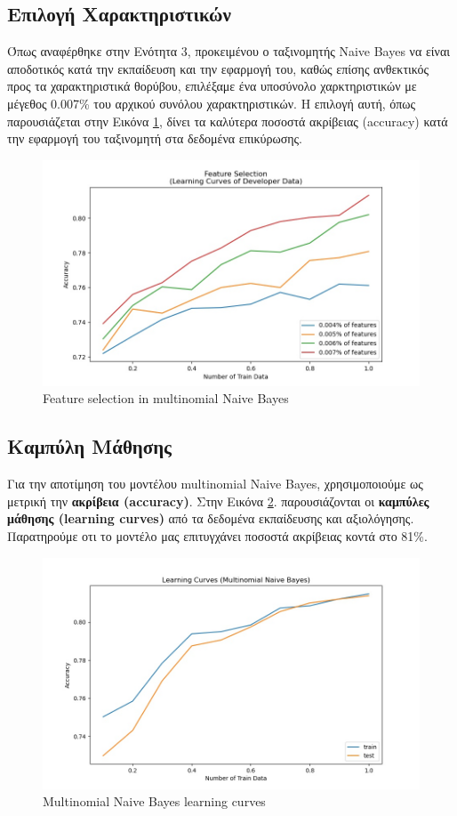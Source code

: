 \documentclass[12pt]{article}
\begin{document}
\subsection{Επιλογή Χαρακτηριστικών}
Όπως αναφέρθηκε στην Ενότητα 3, προκειμένου ο ταξινομητής Naive Bayes να είναι αποδοτικός κατά την εκπαίδευση και την εφαρμογή του, καθώς επίσης ανθεκτικός προς τα χαρακτηριστικά θορύβου, επιλέξαμε ένα υποσύνολο χαρκτηριστικών με μέγεθος 0.007\% του αρχικού συνόλου χαρακτηριστικών. Η επιλογή αυτή, όπως παρουσιάζεται στην Εικόνα \ref{fig:nb-feature-selection}, δίνει τα καλύτερα ποσοστά ακρίβειας (accuracy) κατά την εφαρμογή του ταξινομητή στα δεδομένα επικύρωσης.
\begin{figure}[H]
    \centering
    \includegraphics[scale=.55]{images/nb-feature-selection}
    \caption{Feature selection in multinomial Naive Bayes}
    \label{fig:nb-feature-selection}
\end{figure}

\subsection{Καμπύλη Μάθησης}
Για την αποτίμηση του μοντέλου multinomial Naive Bayes, χρησιμοποιούμε ως μετρική την \textbf{ακρίβεια (accuracy)}. Στην Εικόνα \ref{fig:nb-learning-curves}. παρουσιάζονται οι \textbf{καμπύλες μάθησης (learning curves)} από τα δεδομένα εκπαίδευσης και αξιολόγησης. Παρατηρούμε οτι το μοντέλο μας επιτυγχάνει ποσοστά ακρίβειας κοντά στο 81\%.
\begin{figure}[H]
    \centering
    \includegraphics[scale=.5]{images/nb-learning-curve}
    \caption{Multinomial Naive Bayes learning curves}
    \label{fig:nb-learning-curves}
 \end{figure}
\end{document}
